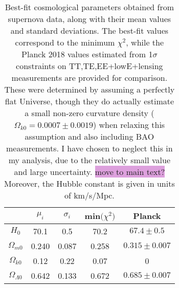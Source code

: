 \documentclass{aa}
\begin{document}
\begin{table}
  \caption{Best-fit cosmological parameters obtained from supernova data, along with their mean values and standard deviations. The best-fit values correspond to the minimum $\chi^2$, while the Planck 2018 values estimated from 1$\sigma$ constraints on TT,TE,EE+lowE+lensing measurements are provided for comparison. These were determined by assuming a perfectly flat Universe, though they do actually estimate a small non-zero curvature density ($\Omega_{k0}=0.0007\pm0.0019$) when relaxing this assumption and also including BAO measurements. I have chosen to neglect this in my analysis, due to the relatively small value and large uncertainty. \colorbox{Plum}{move to main text?} Moreover, the Hubble constant is given in units of km/s/Mpc.}             %
  \label{table:supernova}      %
  \centering                          %
  \begin{tabular}{| c || c | c | c | c |}        %
  \hline                %
   & \hspace{5pt}$\mu_i$\hspace{5pt} & \hspace{7pt}$\sigma_i$\hspace{7pt} & min$\big(\chi^2\big)$ & Planck \\    %
  \hline\hline                     %
  $H_0$ & \hspace{-10pt}70.1 & \hspace{-10.2pt}0.5 & \hspace{-10.8pt}70.2 & \hspace{-5.5pt}$67.4\pm0.5$ \\
  \hline
  $\Omega_{m0}$ & \hspace{4.8pt}0.240 & \hspace{-0.2pt}0.087 & \hspace{4.6pt}0.258 & $0.315\pm0.007$ \\
  \hline
  $\Omega_{k0}$ & \hspace{0pt}0.12 & \hspace{-5pt}0.22 & \hspace{0pt}0.07 & 0 \\
  \hline
  $\Omega_{\Lambda0}$ & \hspace{5pt}0.642 & 0.133 & \hspace{5pt}0.672 & $0.685\pm0.007$ \\
  \hline                                   %
  \end{tabular}
\end{table}
\end{document}
